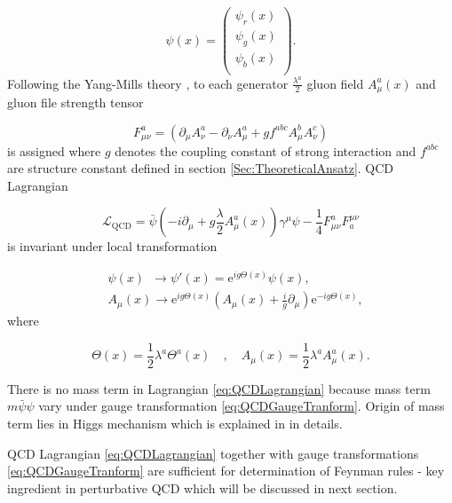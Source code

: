 \documentclass[a4paper,11pt]{report}
\newcommand{\Euler}{\mathrm{e}}
\begin{document}
\begin{equation}
  \psi(x) = \begin{pmatrix}  
    \psi_r(x) \\ \psi_g(x) \\ \psi_b(x) \\ 
            \end{pmatrix}.
  \label{eq:QuarkWaveFunction}
\end{equation}
Following the Yang-Mills theory \cite{YangMill}, to each generator
$\frac{\lambda^a}{2}$ gluon field $A_\mu^a(x)$ and gluon file strength tensor

\begin{equation}
  F_{\mu\nu}^a = \left( \partial_\mu A_\nu^a - \partial_\nu A_\mu^a + g f^{abc}
  A_\mu^b A_\nu^c \right)
  \label{eq:GluonFieldStrengthTensor}
\end{equation}
is assigned where $g$ denotes the coupling constant of strong interaction and
$f^{abc}$ are structure constant defined in section \ref{Sec:TheoreticalAnsatz}.
QCD Lagrangian

\begin{equation}
  \mathscr{L}_{\text{QCD}} = \bar{\psi} \left( -i \partial_\mu + g \frac{\lambda}{2}
  A_\mu^a(x) \right) \gamma^\mu \psi - \frac{1}{4}F_{\mu\nu}^aF_a^{\mu\nu}
  \label{eq:QCDLagrangian}
\end{equation}
is invariant under local transformation

\begin{align}
  &\psi(x) \, \, \, \rightarrow \psi'(x) = \Euler^{ig\Theta(x)} \psi(x),
    \label{eq:QCDGaugeTranform} \\
  &A_\mu(x) \rightarrow \Euler^{ig\Theta(x)} \left( A_\mu(x) +
    \frac{i}{g}\partial_\mu \right) \Euler^{-ig\Theta(x)}, 
  \nonumber
\end{align}
where

\begin{equation}
  \Theta(x) = \frac{1}{2} \lambda^a \Theta^a(x) 
  \quad , \quad
  A_\mu(x) = \frac{1}{2} \lambda^a A_\mu^a(x).
  \label{eq:QCDAdditionalFunctions}
\end{equation}

There is no mass term in Lagrangian \eqref{eq:QCDLagrangian} because mass term
$m\bar{\psi}\psi$ vary under gauge transformation
\eqref{eq:QCDGaugeTranform}. Origin of mass term lies in Higgs mechanism
\cite{HiggsMechanism} which is explained in \cite{horejsi2002fundamentals} in
details.

QCD Lagrangian \eqref{eq:QCDLagrangian} together with gauge transformations
\eqref{eq:QCDGaugeTranform} are sufficient for determination of Feynman rules -
key ingredient in perturbative QCD which will be discussed in next section.
\end{document}
